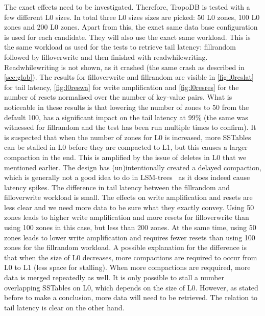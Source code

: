 The exact effects need to be investigated. Therefore, TropoDB is tested with a few different L0 sizes. In total three L0 sizes sizes are picked: 50 L0 zones, 100 L0 zones and 200 L0 zones. Apart from this, the exact same data base configuration is used for each candidate. They will also use the exact same workload. This is the same workload as used for the tests to retrieve tail latency: fillrandom followed by filloverwrite and then finished with readwhilewriting. Readwhilewriting is not shown, as it crashed (the same crash as described in \autoref{sec:glob}). The results for filloverwrite and fillrandom are visible in \autoref{fig:l0reslat} for tail latency, \autoref{fig:l0reswa} for write amplification and \autoref{fig:l0resres} for the number of resets normalised over the number of key-value pairs. What is noticeable in these results is that lowering the number of zones to 50 from the default 100, has a significant impact on the tail latency at 99\% (the same was witnessed for fillrandom and the test has been run multiple times to confirm). It is suspected that when the number of zones for L0 is increased, more SSTables can be stalled in L0 before they are compacted to L1, but this causes a larger compaction in the end. This is amplified by the issue of deletes in L0 that we mentioned earlier. The design has (un)intentionally created a delayed compaction, which is generally not a good idea to do in LSM-trees~\cite{balmau2019silk} as it does indeed cause latency spikes. The difference in tail latency between the fillrandom and filloverwrite workload is small.  The effects on write amplification and resets are less clear and we need more data to be sure what they exactly convey. Using 50 zones leads to higher write amplification and more resets for filloverwrite than using 100 zones in this case, but less than 200 zones. At the same time, using 50 zones leads to lower write amplification and requires fewer resets than using 100 zones for the fillrandom workload. A possible explanation for the difference is that when the size of L0 decreases, more compactions are required to occur from L0 to L1 (less space for stalling). When more compactions are reqquired, more data is merged repeatedly as well. It is only possible to stall a number overlapping SSTables on L0, which depends on the size of L0. However, as stated before to make a conclusion, more data will need to be retrieved. The relation to tail latency is clear on the other hand.

